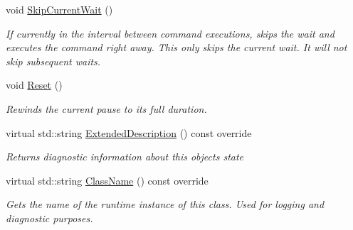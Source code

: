 \begin{DoxyCompactItemize}
void \mbox{\hyperlink{class_command_lib_1_1_periodic_command_a537aa24d843d7ca7a4fe1d9a9e5f1d24}{Skip\+Current\+Wait}} ()
\begin{DoxyCompactList}\small\item\em If currently in the interval between command executions, skips the wait and executes the command right away. This only skips the current wait. It will not skip subsequent waits. \end{DoxyCompactList}\item 
void \mbox{\hyperlink{class_command_lib_1_1_periodic_command_ad07aa39b59712f784b16419fe055783c}{Reset}} ()
\begin{DoxyCompactList}\small\item\em Rewinds the current pause to its full duration. \end{DoxyCompactList}\item 
virtual std\+::string \mbox{\hyperlink{class_command_lib_1_1_periodic_command_a330571debdbd7f7b306dd7f2718e84e5}{Extended\+Description}} () const override
\begin{DoxyCompactList}\small\item\em Returns diagnostic information about this object\textquotesingle{}s state \end{DoxyCompactList}\item 
\mbox{\label{class_command_lib_1_1_periodic_command_a77c34a0f31ae4e7f0c642a356bd5d6ef}} 
virtual std\+::string \mbox{\hyperlink{class_command_lib_1_1_periodic_command_a77c34a0f31ae4e7f0c642a356bd5d6ef}{Class\+Name}} () const override
\begin{DoxyCompactList}\small\item\em Gets the name of the runtime instance of this class. Used for logging and diagnostic purposes.  \end{DoxyCompactList}\end{DoxyCompactItemize}
